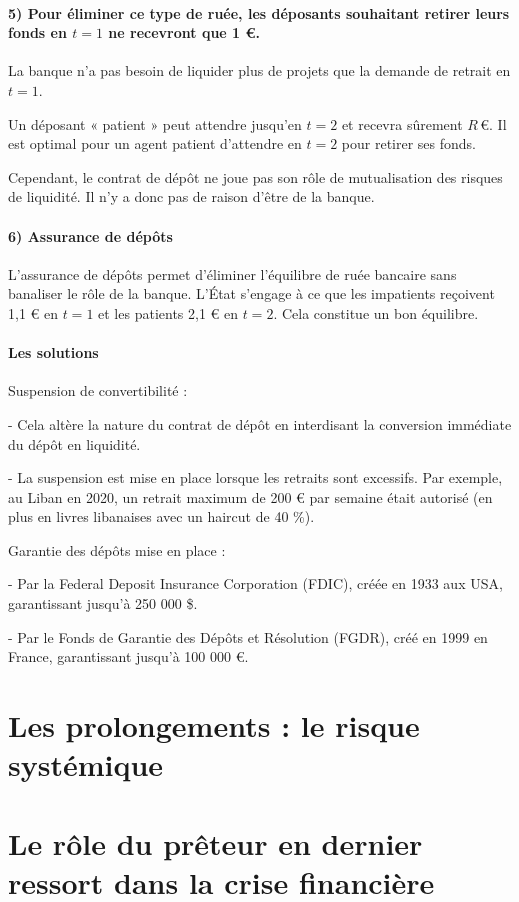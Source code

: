 \documentclass[a4paper, 12pt]{report}
\begin{document}
\paragraph{5) Pour éliminer ce type de ruée, les déposants souhaitant retirer leurs fonds en \( t=1 \) ne recevront que 1 €.}

La banque n’a pas besoin de liquider plus de projets que la demande de retrait en \( t=1 \).

Un déposant « patient » peut attendre jusqu’en \( t=2 \) et recevra sûrement \( R \, € \). Il est optimal pour un agent patient d’attendre en \( t=2 \) pour retirer ses fonds.

Cependant, le contrat de dépôt ne joue pas son rôle de mutualisation des risques de liquidité. Il n’y a donc pas de raison d’être de la banque.

\paragraph{6) Assurance de dépôts}

L'assurance de dépôts permet d'éliminer l'équilibre de ruée bancaire sans banaliser le rôle de la banque. L'État s’engage à ce que les impatients reçoivent 1,1 € en \( t=1 \) et les patients 2,1 € en \( t=2 \). Cela constitue un bon équilibre.

\paragraph{Les solutions}

Suspension de convertibilité :

- Cela altère la nature du contrat de dépôt en interdisant la conversion immédiate du dépôt en liquidité.

- La suspension est mise en place lorsque les retraits sont excessifs. Par exemple, au Liban en 2020, un retrait maximum de 200 € par semaine était autorisé (en plus en livres libanaises avec un haircut de 40 \%).

Garantie des dépôts mise en place :

- Par la Federal Deposit Insurance Corporation (FDIC), créée en 1933 aux USA, garantissant jusqu'à 250 000 \$.

- Par le Fonds de Garantie des Dépôts et Résolution (FGDR), créé en 1999 en France, garantissant jusqu'à 100 000 €.



\section{Les prolongements : le risque systémique}


\section{Le rôle du prêteur en dernier ressort dans la crise financière}
\end{document}
